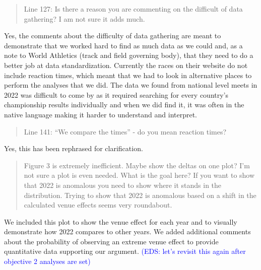 \documentclass[12pt]{article}
\newcommand{\eds}[1]{\textcolor{blue}{(EDS: #1)}}
\newenvironment{comment}%
{\begin{quotation}\noindent\small\it\color{darkblue}\ignorespaces%
}{\end{quotation}}
\begin{document}
\begin{comment}
Line 127: Is there a reason you are commenting on the difficult of data
gathering? I am not sure it adds much.
\end{comment}

Yes, the comments about the difficulty of data gathering are meant to demonstrate
that we worked hard to find as much data as we could and, as a note to World
Athletics (track and field governing body), that they need to do a better job
at data standardization.  Currently the races on their website do not include
reaction times, which meant that we had to look in alternative places to perform
the analyses that we did.  The data we found from national level meets in 2022
was difficult to come by as it required searching for every country's championship
results individually and when we did find it, it was often in the native language
making it harder to understand and interpret.

\begin{comment}
Line 141: “We compare the times” - do you mean reaction times?
\end{comment}

Yes, this has been rephrased for clarification.

\begin{comment}
Figure 3 is extremely inefficient. Maybe show the deltas on one plot? I'm not
sure a plot is even needed. What is the goal here? If you want to show that 2022
is anomalous you need to show where it stands in the distribution. Trying to
show that 2022 is anomalous based on a shift in the calculated venue effects
seems very roundabout.
\end{comment}

We included this plot to show the venue effect for each year and to visually
demonstrate how 2022 compares to other years.  We added additional comments
about the probability of observing an extreme venue effect to provide
quantitative data supporting our argument.
\eds{let's revisit this again after objective 2 analyses are set}




\end{document}
